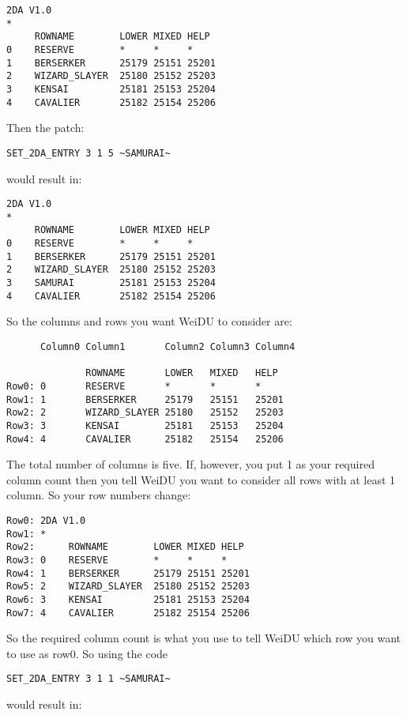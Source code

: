 \documentclass{article}
\begin{document}
\begin{verbatim}
2DA V1.0
*
     ROWNAME        LOWER MIXED HELP
0    RESERVE        *     *     *
1    BERSERKER      25179 25151 25201
2    WIZARD_SLAYER  25180 25152 25203
3    KENSAI         25181 25153 25204
4    CAVALIER       25182 25154 25206
\end{verbatim}

Then the patch:

\begin{verbatim}
SET_2DA_ENTRY 3 1 5 ~SAMURAI~
\end{verbatim}

would result in:

\begin{verbatim}
2DA V1.0
*
     ROWNAME        LOWER MIXED HELP
0    RESERVE        *     *     *
1    BERSERKER      25179 25151 25201
2    WIZARD_SLAYER  25180 25152 25203
3    SAMURAI        25181 25153 25204
4    CAVALIER       25182 25154 25206
\end{verbatim}

So the columns and rows you want WeiDU to consider are:

\begin{verbatim}
      Column0 Column1       Column2 Column3 Column4

              ROWNAME       LOWER   MIXED   HELP
Row0: 0       RESERVE       *       *       *
Row1: 1       BERSERKER     25179   25151   25201
Row2: 2       WIZARD_SLAYER 25180   25152   25203
Row3: 3       KENSAI        25181   25153   25204
Row4: 4       CAVALIER      25182   25154   25206
\end{verbatim}

The total number of columns is five. If, however, you put 1 as your
required column count then you tell WeiDU you want to consider all rows
with at least 1 column. So your row numbers change:

\begin{verbatim}
Row0: 2DA V1.0
Row1: *
Row2:      ROWNAME        LOWER MIXED HELP
Row3: 0    RESERVE        *     *     *
Row4: 1    BERSERKER      25179 25151 25201
Row5: 2    WIZARD_SLAYER  25180 25152 25203
Row6: 3    KENSAI         25181 25153 25204
Row7: 4    CAVALIER       25182 25154 25206
\end{verbatim}

So the required column count is what you use to tell WeiDU which row you
want to use as row0. So using the code
\begin{verbatim}
SET_2DA_ENTRY 3 1 1 ~SAMURAI~
\end{verbatim}
would result in:
\end{document}
